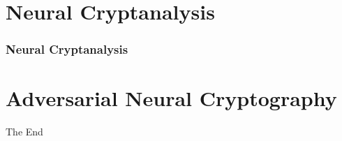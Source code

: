 \documentclass{beamer}
\begin{document}





\section{Neural Cryptanalysis}
\begin{frame}
\frametitle{Neural Cryptanalysis}
\end{frame}

\section{Adversarial Neural Cryptography}
\begin{frame}
\Huge{\centerline{The End}}
\end{frame}
\end{document}
